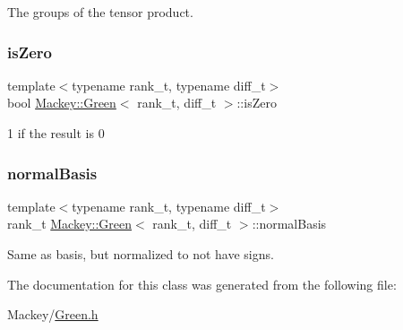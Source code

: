 The groups of the tensor product. 

\mbox{\label{classMackey_1_1Green_a12a01a6d1715538af0bdc6b34fad6b85}} 
\subsubsection{\texorpdfstring{is\+Zero}{isZero}}
{\footnotesize\ttfamily template$<$typename rank\+\_\+t, typename diff\+\_\+t$>$ \\
bool \hyperlink{classMackey_1_1Green}{Mackey\+::\+Green}$<$ rank\+\_\+t, diff\+\_\+t $>$\+::is\+Zero}



1 if the result is 0 

\mbox{\label{classMackey_1_1Green_a7fd2fac9558c75fdef0b0ded1bee70d8}} 
\subsubsection{\texorpdfstring{normal\+Basis}{normalBasis}}
{\footnotesize\ttfamily template$<$typename rank\+\_\+t, typename diff\+\_\+t$>$ \\
rank\+\_\+t \hyperlink{classMackey_1_1Green}{Mackey\+::\+Green}$<$ rank\+\_\+t, diff\+\_\+t $>$\+::normal\+Basis}



Same as basis, but normalized to not have signs. 



The documentation for this class was generated from the following file\+:\begin{DoxyCompactItemize}
\item 
Mackey/\hyperlink{Green_8h}{Green.\+h}\end{DoxyCompactItemize}

